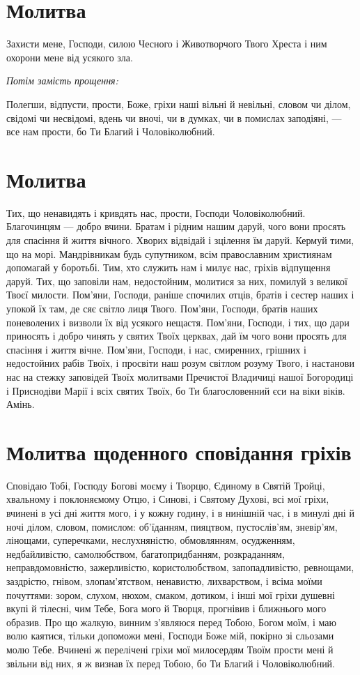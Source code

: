 \documentclass[chapters.tex]{subfiles}
\begin{document}
\section{Молитва}
Захисти мене, Господи, силою Чесного і Животворчого Твого Хреста і ним охорони мене від усякого зла.

\emph{Потім замість прощення:}

Полегши, відпусти, прости, Боже, гріхи наші вільні й невільні, словом чи ділом, свідомі чи несвідомі, вдень чи вночі, чи в думках, чи в помислах заподіяні, — все нам прости, бо Ти Благий і Чоловіколюбний.

\section{Молитва}
Тих, що ненавидять і кривдять нас, прости, Господи Чоловіколюбний. Благочинцям — добро вчини. Братам і рідним нашим даруй, чого вони просять для спасіння й життя вічного. Хворих відвідай і зцілення їм даруй. Кермуй тими, що на морі. Мандрівникам будь супутником, всім православним християнам допомагай у боротьбі. Тим, хто служить нам і милує нас, гріхів відпущення даруй. Тих, що заповіли нам, недостойним, молитися за них, помилуй з великої Твоєї милости. Пом’яни, Господи, раніше спочилих отців, братів і сестер наших і упокой їх там, де сяє світло лиця Твого. Пом’яни, Господи, братів наших поневолених і визволи їх від усякого нещастя. Пом’яни, Господи, і тих, що дари приносять і добро чинять у святих Твоїх церквах, дай їм чого вони просять для спасіння і життя вічне. Пом’яни, Господи, і нас, смиренних, грішних і недостойних рабів Твоїх, і просвіти наш розум світлом розуму Твого, і настанови нас на стежку заповідей Твоїх молитвами Пречистої Владичиці нашої Богородиці і Приснодіви Марії і всіх святих Твоїх, бо Ти благословенний єси на віки віків. Амінь.

\section{Молитва щоденного сповідання гріхів}
Сповідаю Тобі, Господу Богові моєму і Творцю, Єдиному в Святій Тройці, хвальному і поклоняємому Отцю, і Синові, і Святому Духові, всі мої гріхи, вчинені в усі дні життя мого, і у кожну годину, і в нинішній час, і в минулі дні й ночі ділом, словом, помислом: об’їданням, пияцтвом, пустослів’ям, зневір’ям, лінощами, суперечками, неслухняністю, обмовлянням, осудженням, недбайливістю, самолюбством, багатопридбанням, розкраданням, неправдомовністю, зажерливістю, користолюбством, запопадливістю, ревнощами, заздрістю, гнівом, злопам’ятством, ненавистю, лихварством, і всіма моїми почуттями: зором, слухом, нюхом, смаком, дотиком, і інші мої гріхи душевні вкупі й тілесні, чим Тебе, Бога мого й Творця, прогнівив і ближнього мого образив. Про що жалкую, винним з’являюся перед Тобою, Богом моїм, і маю волю каятися, тільки допоможи мені, Господи Боже мій, покірно зі сльозами молю Тебе. Вчинені ж перелічені гріхи мої милосердям Твоїм прости мені й звільни від них, я ж визнав їх перед Тобою, бо Ти Благий і Чоловіколюбний.
\end{document}
